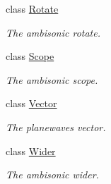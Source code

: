 \begin{DoxyCompactItemize}
class \hyperlink{class_hoa3_d_1_1_rotate}{Rotate}
\begin{DoxyCompactList}\small\item\em The ambisonic rotate. \end{DoxyCompactList}\item 
class \hyperlink{class_hoa3_d_1_1_scope}{Scope}
\begin{DoxyCompactList}\small\item\em The ambisonic scope. \end{DoxyCompactList}\item 
class \hyperlink{class_hoa3_d_1_1_vector}{Vector}
\begin{DoxyCompactList}\small\item\em The planewaves vector. \end{DoxyCompactList}\item 
class \hyperlink{class_hoa3_d_1_1_wider}{Wider}
\begin{DoxyCompactList}\small\item\em The ambisonic wider. \end{DoxyCompactList}\end{DoxyCompactItemize}
